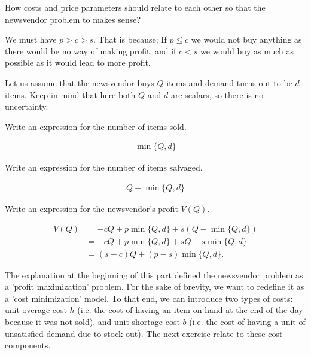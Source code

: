 \begin{question}
How costs and price parameters should relate to each other so that the newsvendor problem to makes sense?
\end{question}

\begin{solution}
We must have $p>c>s$. That is because; If $p\leq c$ we would not buy anything as there would be no way of making profit, and if $c<s$ we would buy as much as possible as it would lead to more profit. 
\end{solution}

Let us assume that the newsvendor buys $Q$ items and demand turns out to be $d$ items. Keep in mind that here both $Q$ and $d$ are scalars, so there is no uncertainty. 

\begin{question}
Write an expression for the number of items sold.
\end{question}

\begin{solution}
\begin{align*}
\min\{Q,d\}
\end{align*}
\end{solution}

\begin{question}
Write an expression for the number of items salvaged.
\end{question}

\begin{solution}
\begin{align*}
Q-\min\{Q,d\}
\end{align*}
\end{solution}

\begin{question}
Write an expression for the newsvendor's profit $V(Q)$.
\end{question}

\begin{solution}
\begin{equation*}
  \begin{split}
V(Q) 
&= -cQ + p\min\{Q,d\} + s(Q-\min\{Q,d\}) \\
&=  -cQ + p \min\{Q,d\} + sQ - s \min\{Q,d\} \\
&= (s-c)Q + (p-s) \min\{Q,d\}.
  \end{split}
\end{equation*}
\end{solution}

The explanation at the beginning of this part defined the newsvendor problem as a 'profit maximization' problem. For the sake of brevity, we want to redefine it as a 'cost minimization' model. To that end, we can introduce two types of costs: unit overage cost $h$ (i.e. the cost of having an item on hand at the end of the day because it was not sold), and unit shortage cost $b$ (i.e. the cost of having a unit of unsatisfied demand due to stock-out). The next exercise relate to these cost components.

